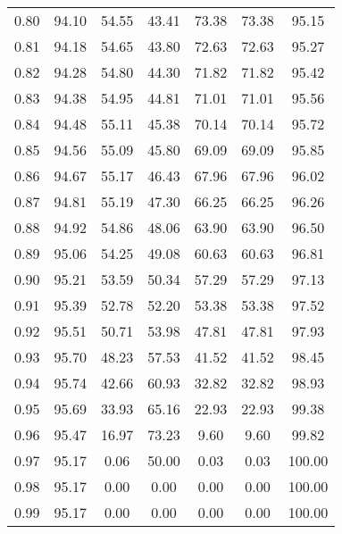 \begin{tabular}{|c|c|c|c|c|c|c|}
      0.80 &     94.10 &     54.55 &      43.41 &   73.38 &      73.38 &         95.15 \\
      0.81 &     94.18 &     54.65 &      43.80 &   72.63 &      72.63 &         95.27 \\
      0.82 &     94.28 &     54.80 &      44.30 &   71.82 &      71.82 &         95.42 \\
      0.83 &     94.38 &     54.95 &      44.81 &   71.01 &      71.01 &         95.56 \\
      0.84 &     94.48 &     55.11 &      45.38 &   70.14 &      70.14 &         95.72 \\
      0.85 &     94.56 &     55.09 &      45.80 &   69.09 &      69.09 &         95.85 \\
      0.86 &     94.67 &     55.17 &      46.43 &   67.96 &      67.96 &         96.02 \\
      0.87 &     94.81 &     55.19 &      47.30 &   66.25 &      66.25 &         96.26 \\
      0.88 &     94.92 &     54.86 &      48.06 &   63.90 &      63.90 &         96.50 \\
      0.89 &     95.06 &     54.25 &      49.08 &   60.63 &      60.63 &         96.81 \\
      0.90 &     95.21 &     53.59 &      50.34 &   57.29 &      57.29 &         97.13 \\
      0.91 &     95.39 &     52.78 &      52.20 &   53.38 &      53.38 &         97.52 \\
      0.92 &     95.51 &     50.71 &      53.98 &   47.81 &      47.81 &         97.93 \\
      0.93 &     95.70 &     48.23 &      57.53 &   41.52 &      41.52 &         98.45 \\
      0.94 &     95.74 &     42.66 &      60.93 &   32.82 &      32.82 &         98.93 \\
      0.95 &     95.69 &     33.93 &      65.16 &   22.93 &      22.93 &         99.38 \\
      0.96 &     95.47 &     16.97 &      73.23 &    9.60 &       9.60 &         99.82 \\
      0.97 &     95.17 &      0.06 &      50.00 &    0.03 &       0.03 &        100.00 \\
      0.98 &     95.17 &      0.00 &       0.00 &    0.00 &       0.00 &        100.00 \\
      0.99 &     95.17 &      0.00 &       0.00 &    0.00 &       0.00 &        100.00 \\
\bottomrule
\end{tabular}
